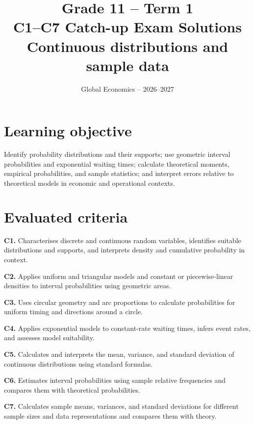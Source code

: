 \newcommand{\NorthDiagram}[2]{%
\begin{tikzpicture}[scale=0.85]
\fill[blue!30] (0,0)--({90-#1}:2) arc[start angle={90-#1},end angle={90+#1},radius=2]--cycle;
\draw[thick] (0,0) circle (2);
\draw[->] (0,0)--(90:2.65) node[above]{North ($0$)};
\draw[dashed] (0,0)--({90-#1}:2.2);
\draw[dashed] (0,0)--({90+#1}:2.2);
\node[anchor=west] at ({90-#1}:2.35){$+#2$};
\node[anchor=east] at ({90+#1}:2.35){$-#2$};
\node at (0,-2.45){Full circle: $360^\circ=2\pi$ rad};
\end{tikzpicture}}
\title{Grade 11 -- Term 1\\C1--C7 Catch-up Exam Solutions\\\large Continuous distributions and sample data}
\author{Global Economics -- 2026--2027}
\date{}

\maketitle
{}\label{toc}\tableofcontents
\clearpage
\section*{Learning objective}
Identify probability distributions and their supports; use geometric interval probabilities and exponential waiting times; calculate theoretical moments, empirical probabilities, and sample statistics; and interpret errors relative to theoretical models in economic and operational contexts.\section*{Evaluated criteria}
	\textbf{C1.} Characterises discrete and continuous random variables, identifies suitable distributions and supports, and interprets density and cumulative probability in context.\par
	\textbf{C2.} Applies uniform and triangular models and constant or piecewise-linear densities to interval probabilities using geometric areas.\par
	\textbf{C3.} Uses circular geometry and arc proportions to calculate probabilities for uniform timing and directions around a circle.\par
	\textbf{C4.} Applies exponential models to constant-rate waiting times, infers event rates, and assesses model suitability.\par
	\textbf{C5.} Calculates and interprets the mean, variance, and standard deviation of continuous distributions using standard formulas.\par
	\textbf{C6.} Estimates interval probabilities using sample relative frequencies and compares them with theoretical probabilities.\par
	\textbf{C7.} Calculates sample means, variances, and standard deviations for different sample sizes and data representations and compares them with theory.
